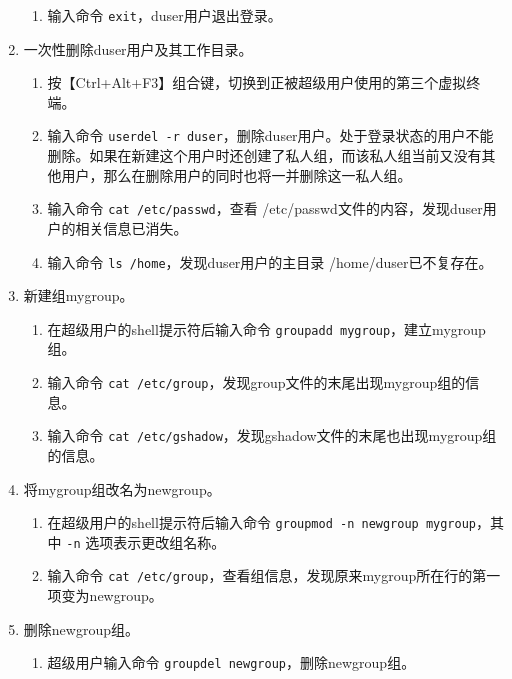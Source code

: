 \begin{enumerate}
\begin{enumerate}
      \item 输入命令 \verb|exit|，duser用户退出登录。
    \end{enumerate}
  \item 一次性删除duser用户及其工作目录。
    \begin{enumerate}
      \item 按【Ctrl+Alt+F3】组合键，切换到正被超级用户使用的第三个虚拟终端。
      \item 输入命令 \verb|userdel -r duser|，删除duser用户。处于登录状态的用户不能删除。如果在新建这个用户时还创建了私人组，而该私人组当前又没有其他用户，那么在删除用户的同时也将一并删除这一私人组。
      \item 输入命令 \verb|cat /etc/passwd|，查看 /etc/passwd文件的内容，发现duser用户的相关信息已消失。
      \item 输入命令 \verb|ls /home|，发现duser用户的主目录 /home/duser已不复存在。
    \end{enumerate}
  \item 新建组mygroup。
    \begin{enumerate}
      \item 在超级用户的shell提示符后输入命令 \verb|groupadd mygroup|，建立mygroup组。
      \item 输入命令 \verb|cat /etc/group|，发现group文件的末尾出现mygroup组的信息。
      \item 输入命令 \verb|cat /etc/gshadow|，发现gshadow文件的末尾也出现mygroup组的信息。
    \end{enumerate}
  \item 将mygroup组改名为newgroup。
    \begin{enumerate}
      \item 在超级用户的shell提示符后输入命令 \verb|groupmod -n newgroup mygroup|，其中 \verb|-n| 选项表示更改组名称。
      \item 输入命令 \verb|cat /etc/group|，查看组信息，发现原来mygroup所在行的第一项变为newgroup。
    \end{enumerate}
  \item 删除newgroup组。
    \begin{enumerate}
      \item 超级用户输入命令 \verb|groupdel newgroup|，删除newgroup组。
    \end{enumerate}
\end{enumerate}

